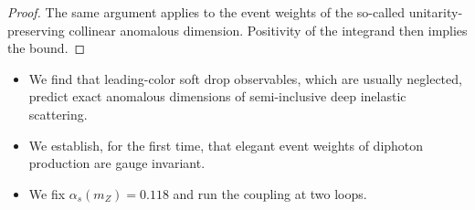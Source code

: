 \begin{proof}
The same argument applies to the event weights of the so-called
unitarity-preserving collinear anomalous dimension. Positivity of the
integrand then implies the bound.
\end{proof}

\begin{itemize}
  \item We find that leading-color soft drop observables, which are usually neglected, predict exact anomalous dimensions of semi-inclusive deep inelastic scattering.
  \item We establish, for the first time, that elegant event weights of diphoton production are gauge invariant.
  \item We fix $\alpha_s(m_Z) = 0.118$ and run the coupling at two loops.
\end{itemize}

